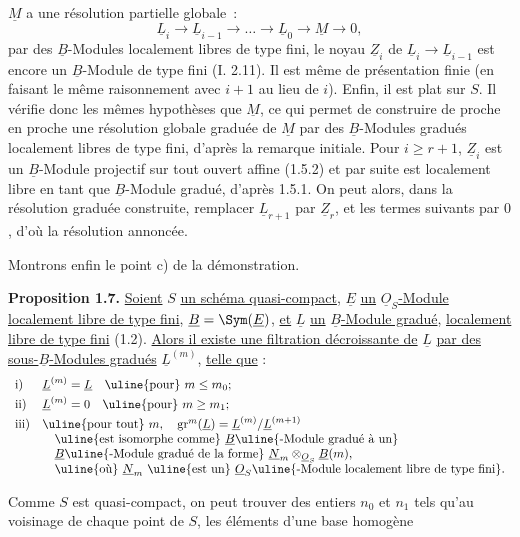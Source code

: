 
\(\underline{M}\) a une
résolution partielle globale~:
\[
  \underline{L}_i\longrightarrow \underline{L}_{i-1}\longrightarrow\ldots\longrightarrow \underline{L}_0\longrightarrow \underline{M}\longrightarrow 0,
\]
par des \(\underline{B}\)-Modules localement libres de type fini, le noyau \(\underline{Z}_i\) de \(\underline{L}_i\to \underline{L}_{i-1}\) est encore un \(\underline{B}\)-Module de type fini (I. 2.11). Il est même de présentation finie (en faisant le même raisonnement avec \(i+1\) au lieu de \(i\)). Enfin, il est plat sur \(S\). Il vérifie donc les mêmes hypothèses que \(\underline{M}\), ce qui permet de construire de proche en proche une résolution globale graduée de \(\underline{M}\) par des \(\underline{B}\)-Modules gradués localement libres de type fini, d'après la remarque initiale. Pour \(i\geq r+1\), \(\underline{Z}_i\) est un \(\underline{B}\)-Module projectif sur tout ouvert affine (1.5.2) et par suite est localement libre en tant que \(\underline{B}\)-Module gradué, d'après 1.5.1. On peut alors, dans la résolution graduée construite, remplacer \(\underline{L}_{r+1}\) par \(\underline{Z}_r\), et les termes suivants par \(0\), d'où la résolution annoncée.

Montrons enfin le point c) de la démonstration.

\textbf{Proposition 1.7.} \uline{Soient} \(S\) \uline{un schéma quasi-compact}, \(\underline{E}\) \uline{un} \(\underline{O}_S\)\uline{-Module localement libre de type fini}, \(\underline{B}=\Sym(\underline{E})\), \uline{et} \(\underline{L}\) \uline{un} \(\underline{B}\)\uline{-Module gradué}, \uline{localement libre de type fini} (1.2). \uline{Alors il existe une filtration décroissante de} \(\underline{L}\) \uline{par des sous-}\(\underline{B}\)\uline{-Modules gradués} \(\underline{L}^{(m)}\), \uline{telle que} :
\[
\begin{array}{ll}
\text{i)}& \underline{L}^{(m)}=\underline{L}\quad\text{\uline{pour} }m\leq m_0;\\[1mm]
\text{ii)}& \underline{L}^{(m)}=0\quad\text{\uline{pour} }m\geq m_1;\\[1mm]
\text{iii)}& \text{\uline{pour tout} }m,\quad \operatorname{gr}^m(\underline{L})=\underline{L}^{(m)}/\underline{L}^{(m+1)}\\
&\quad \text{\uline{est isomorphe comme} }\underline{B}\text{\uline{-Module gradué à un}}\\
&\quad \underline{B}\text{\uline{-Module gradué de la forme} }\underline{N}_m\otimes_{\underline{O}_S}\underline{B}(m),\\
&\quad \text{\uline{où} }\underline{N}_m\text{ \uline{est un} }\underline{O}_S\text{\uline{-Module localement libre de type fini}.}
\end{array}
\]

Comme \(S\) est quasi-compact, on peut trouver des entiers \(n_0\) et \(n_1\) tels qu'au voisinage de chaque point de \(S\), les éléments d'une base homogène 
